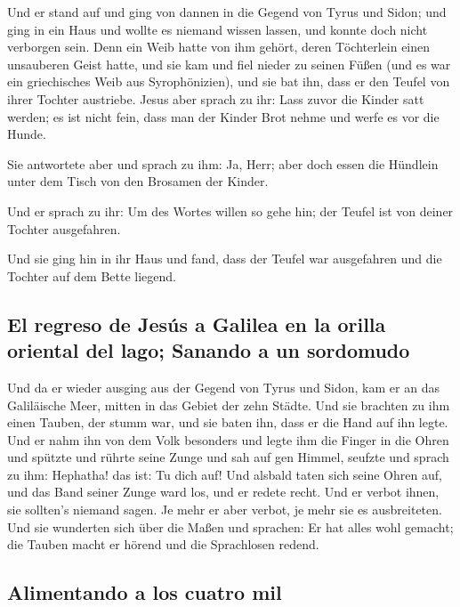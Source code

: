  Und er stand auf und ging von dannen in die Gegend von
Tyrus und Sidon; und ging in ein Haus und wollte es niemand wissen
lassen, und konnte doch nicht verborgen sein.  Denn ein
Weib hatte von ihm gehört, deren Töchterlein einen unsauberen Geist
hatte, und sie kam und fiel nieder zu seinen Füßen  (und
es war ein griechisches Weib aus Syrophönizien), und sie bat ihn, dass
er den Teufel von ihrer Tochter austriebe.  Jesus aber
sprach zu ihr: Lass zuvor die Kinder satt werden; es ist nicht fein,
dass man der Kinder Brot nehme und werfe es vor die Hunde.

 Sie antwortete aber und sprach zu ihm: Ja, Herr; aber
doch essen die Hündlein unter dem Tisch von den Brosamen der Kinder.

 Und er sprach zu ihr: Um des Wortes willen so gehe hin;
der Teufel ist von deiner Tochter ausgefahren.

 Und sie ging hin in ihr Haus und fand, dass der Teufel
war ausgefahren und die Tochter auf dem Bette liegend.

\hypertarget{el-regreso-de-jesuxfas-a-galilea-en-la-orilla-oriental-del-lago-sanando-a-un-sordomudo}{%
\subsection{El regreso de Jesús a Galilea en la orilla oriental del
lago; Sanando a un
sordomudo}\label{el-regreso-de-jesuxfas-a-galilea-en-la-orilla-oriental-del-lago-sanando-a-un-sordomudo}}

 Und da er wieder ausging aus der Gegend von Tyrus und
Sidon, kam er an das Galiläische Meer, mitten in das Gebiet der zehn
Städte.  Und sie brachten zu ihm einen Tauben, der stumm
war, und sie baten ihn, dass er die Hand auf ihn legte. 
Und er nahm ihn von dem Volk besonders und legte ihm die Finger in die
Ohren und spützte und rührte seine Zunge  und sah auf gen
Himmel, seufzte und sprach zu ihm: Hephatha! das ist: Tu dich auf!
 Und alsbald taten sich seine Ohren auf, und das Band
seiner Zunge ward los, und er redete recht.  Und er
verbot ihnen, sie sollten's niemand sagen. Je mehr er aber verbot, je
mehr sie es ausbreiteten.  Und sie wunderten sich über
die Maßen und sprachen: Er hat alles wohl gemacht; die Tauben macht er
hörend und die Sprachlosen redend.

\hypertarget{alimentando-a-los-cuatro-mil}{%
\subsection{Alimentando a los cuatro
mil}\label{alimentando-a-los-cuatro-mil}}

